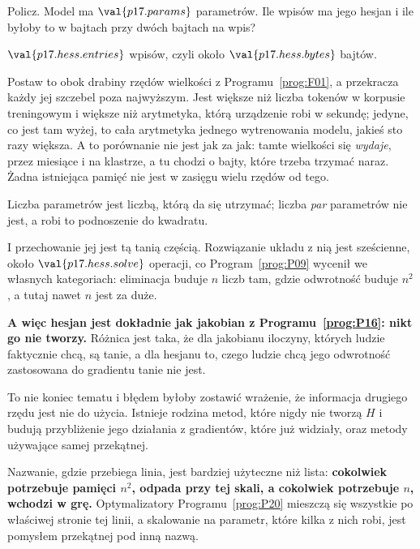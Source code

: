 \begin{fr}
Policz. Model ma $\val{p17.params}$ parametrów. Ile wpisów ma jego hesjan i
ile byłoby to w bajtach przy dwóch bajtach na wpis?
\dotline
\nextframe
\end{fr}

\begin{fr}
\begin{ansblock}
$\val{p17.hess.entries}$ wpisów, czyli około $\val{p17.hess.bytes}$ bajtów.
\end{ansblock}

Postaw to obok drabiny rzędów wielkości z Programu~\ref{prog:F01}, a
przekracza każdy jej szczebel poza najwyższym. Jest większe niż liczba tokenów
w korpusie treningowym i większe niż arytmetyka, którą urządzenie robi w
sekundę; jedyne, co jest tam wyżej, to cała arytmetyka jednego wytrenowania
modelu, jakieś sto razy większa. A to porównanie nie jest jak za jak: tamte
wielkości się \emph{wydaje}, przez miesiące i na klastrze, a tu chodzi o
bajty, które trzeba trzymać naraz. Żadna istniejąca pamięć nie jest w zasięgu
wielu rzędów od tego.

Liczba parametrów jest liczbą, którą da się utrzymać; liczba \emph{par}
parametrów nie jest, a robi to podnoszenie do kwadratu.

I przechowanie jej jest tą tanią częścią. Rozwiązanie układu z nią jest
sześcienne, około $\val{p17.hess.solve}$ operacji, co Program~\ref{prog:P09}
wycenił we własnych kategoriach: eliminacja buduje $n$ liczb tam, gdzie odwrotność
buduje $n^{2}$, a tutaj nawet $n$ jest za duże.

\textbf{A więc hesjan jest dokładnie jak jakobian z
Programu~\ref{prog:P16}: nikt go nie tworzy.} Różnica jest taka, że dla
jakobianu iloczyny, których ludzie faktycznie chcą, są tanie, a dla hesjanu to,
czego ludzie chcą \dash{} jego odwrotność zastosowana do gradientu \dash{}
tanie nie jest.
\end{fr}

\begin{fr}
\begin{note}
To nie koniec tematu i błędem byłoby zostawić wrażenie, że informacja drugiego
rzędu jest nie do użycia. Istnieje rodzina metod, które nigdy nie tworzą $H$ i
budują przybliżenie jego działania z gradientów, które już widziały, oraz
metody używające samej przekątnej.

Nazwanie, gdzie przebiega linia, jest bardziej użyteczne niż lista:
\textbf{cokolwiek potrzebuje pamięci $n^{2}$, odpada przy tej skali, a
cokolwiek potrzebuje $n$, wchodzi w grę.} Optymalizatory
Programu~\ref{prog:P20} mieszczą się wszystkie po właściwej stronie tej linii,
a skalowanie na parametr, które kilka z nich robi, jest pomysłem przekątnej
pod inną nazwą.
\end{note}
\end{fr}

